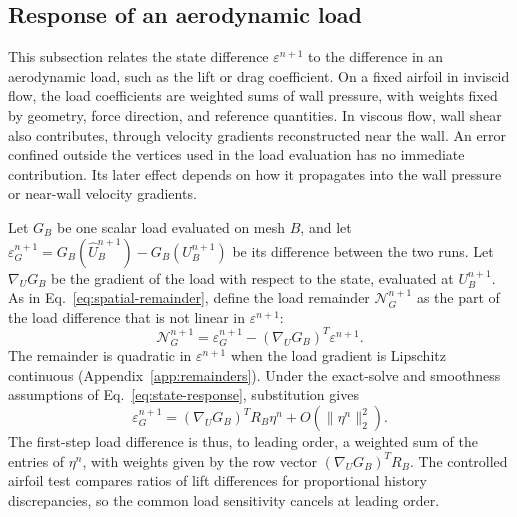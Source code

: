 \documentclass[a4paper,fleqn]{cas-sc}
\newcommand{\eps}{\varepsilon}
\begin{document}
\subsection{Response of an aerodynamic load}
\label{sec:delayed-response}

This subsection relates the state difference $\eps^{n+1}$ to the difference in an aerodynamic load, such as the lift or drag coefficient. On a fixed airfoil in inviscid flow, the load coefficients are weighted sums of wall pressure, with weights fixed by geometry, force direction, and reference quantities. In viscous flow, wall shear also contributes, through velocity gradients reconstructed near the wall. An error confined outside the vertices used in the load evaluation has no immediate contribution. Its later effect depends on how it propagates into the wall pressure or near-wall velocity gradients.

Let $G_B$ be one scalar load evaluated on mesh $B$, and let $\eps_G^{n+1}=G_B(\widehat U_B^{n+1})-G_B(U_B^{n+1})$ be its difference between the two runs. Let $\nabla_U G_B$ be the gradient of the load with respect to the state, evaluated at $U_B^{n+1}$. As in Eq.~\eqref{eq:spatial-remainder}, define the load remainder $\mathcal N_G^{n+1}$ as the part of the load difference that is not linear in $\eps^{n+1}$:
\begin{equation}
 \mathcal N_G^{n+1}=\eps_G^{n+1}-(\nabla_U G_B)^T\eps^{n+1}.
 \label{eq:output-remainder}
\end{equation}
The remainder is quadratic in $\eps^{n+1}$ when the load gradient is Lipschitz continuous (Appendix~\ref{app:remainders}). Under the exact-solve and smoothness assumptions of Eq.~\eqref{eq:state-response}, substitution gives
\begin{equation}
 \eps_G^{n+1}=(\nabla_U G_B)^TR_B\eta^n+O(\|\eta^n\|_2^2).
 \label{eq:force-response}
\end{equation}
The first-step load difference is thus, to leading order, a weighted sum of the entries of $\eta^n$, with weights given by the row vector $(\nabla_U G_B)^TR_B$. The controlled airfoil test compares ratios of lift differences for proportional history discrepancies, so the common load sensitivity cancels at leading order.
\end{document}
